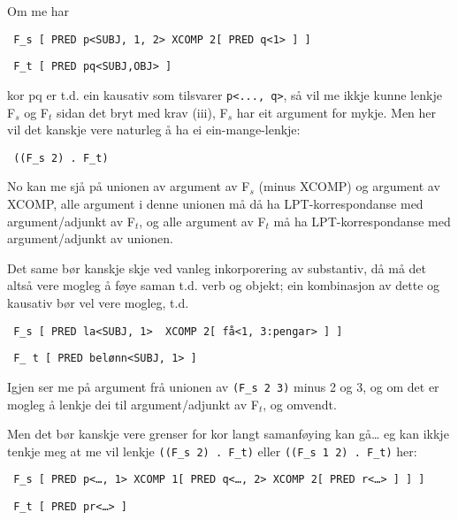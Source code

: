 \documentclass[11pt,a4paper,oneside,draft]{book}
\begin{document}
Om me har 

\begin{verbatim}
 F_s [ PRED p<SUBJ, 1, 2> XCOMP 2[ PRED q<1> ] ]
\end{verbatim}


\begin{verbatim}
 F_t [ PRED pq<SUBJ,OBJ> ]
\end{verbatim}


kor pq er t.d. ein kausativ som tilsvarer \texttt{p<..., q>}, så vil me ikkje
kunne lenkje F$_s$ og F$_t$ sidan det bryt med krav (iii), F$_s$ har eit
argument for mykje. Men her vil det kanskje vere naturleg å ha ei
ein-mange-lenkje:

\begin{verbatim}
 ((F_s 2) . F_t)
\end{verbatim}


No kan me sjå på unionen av argument av F$_s$ (minus XCOMP) og argument
av XCOMP, alle argument i denne unionen må då ha LPT-korrespondanse
med argument/adjunkt av F$_t$, og alle argument av F$_t$ må ha
LPT-korrespondanse med argument/adjunkt av unionen.

Det same bør kanskje skje ved vanleg inkorporering av substantiv, då
må det altså vere mogleg å føye saman t.d. verb og objekt; ein
kombinasjon av dette og kausativ bør vel vere mogleg, t.d.

\begin{verbatim}
 F_s [ PRED la<SUBJ, 1>  XCOMP 2[ få<1, 3:pengar> ] ]
\end{verbatim}


\begin{verbatim}
 F_ t [ PRED belønn<SUBJ, 1> ]
\end{verbatim}


Igjen ser me på argument frå unionen av \texttt{(F\_s 2 3)} minus 2 og 3, og
om det er mogleg å lenkje dei til argument/adjunkt av F$_t$, og omvendt.

Men det bør kanskje vere grenser for kor langt samanføying kan gå… eg
kan ikkje tenkje meg at me vil lenkje \texttt{((F\_s 2) . F\_t)} eller \texttt{((F\_s 1 2) . F\_t)} her:

\begin{verbatim}
 F_s [ PRED p<…, 1> XCOMP 1[ PRED q<…, 2> XCOMP 2[ PRED r<…> ] ] ]
\end{verbatim}


\begin{verbatim}
 F_t [ PRED pr<…> ]
\end{verbatim}
\end{document}
